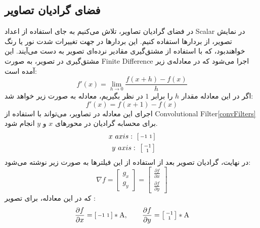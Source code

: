 \subsection{فضای گرادیان تصاویر} \label{imageGradExp}
در فضای گرادیان تصاویر، تلاش می‌کنیم به جای استفاده از اعداد \gls{Scalar} در نمایش تصویر، از بردار‌ها استفاده کنیم. این بردار‌ها در جهت تغییرات شدت نور یا رنگ خواهند‌بود، که با استفاده از مشتق‌گیری مقادیر نرده‌ای تصویر به دست می‌آیند. این مشتق‌گیری در تصویر، به صورت \gls{Finite Difference} اجرا می‌شود که در معادله‌ی زیر آمده است:
\begin{equation}
	f'(x) = \lim_{h\to 0}\frac{f(x+h) - f(x)}{h}
\end{equation}
اگر در این معادله مقدار $h$ را برابر $1$ در نظر بگیریم، معادله به صورت زیر خواهد شد:
\begin{equation}
	f'(x) = f(x+1) - f(x)
\end{equation}
اجرای این معادله در تصاویر، می‌تواند با استفاده از \gls{Convolutional Filter}\ref{convFilters} برای محسابه گرادیان در محور‌های $x$ و  $y$ انجام شود.
\begin{equation} \label{convFilters}
	\begin{split}
		x\ axis:\ \begin{bsmallmatrix}-1 & 1\end{bsmallmatrix} \\ 
		y\ axis:\ \begin{bsmallmatrix}-1 \\ 1\end{bsmallmatrix}
	\end{split}
\end{equation}
در نهایت، گرادیان تصویر بعد از استفاده از این فیلتر‌ها به صورت زیر نوشته می‌شود:
\begin{equation}
	\nabla f = \begin{bmatrix}g_x \\  g_y\end{bmatrix} = \begin{bmatrix}\frac{\partial f}{\partial x} \\  \frac{\partial f}{\partial y}\end{bmatrix}
\end{equation}
که در این معادله، برای تصویر :
\begin{equation}
	\frac{\partial f}{\partial x} = \begin{bsmallmatrix}-1 & 1\end{bsmallmatrix} * \text{A},\qquad \frac{\partial f}{\partial y} = \begin{bsmallmatrix}-1 \\ 1\end{bsmallmatrix} * \text{A}
\end{equation}
